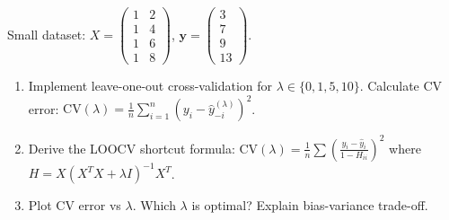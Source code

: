 \documentclass[12pt]{article}
\begin{document}
\begin{tcolorbox}[colback=blue!5!white, colframe=blue!75!black, title=Problem 22]
Small dataset: $X = \begin{pmatrix} 1 & 2 \\ 1 & 4 \\ 1 & 6 \\ 1 & 8 \end{pmatrix}$, $\mathbf{y} = \begin{pmatrix} 3 \\ 7 \\ 9 \\ 13 \end{pmatrix}$.

\begin{enumerate}
\item[(a)] Implement leave-one-out cross-validation for $\lambda \in \{0, 1, 5, 10\}$. Calculate CV error: $\text{CV}(\lambda) = \frac{1}{n}\sum_{i=1}^n (y_i - \hat{y}_{-i}^{(\lambda)})^2$.
\item[(b)] Derive the LOOCV shortcut formula: $\text{CV}(\lambda) = \frac{1}{n}\sum \left(\frac{y_i - \hat{y}_i}{1 - H_{ii}}\right)^2$ where $H = X(X^TX + \lambda I)^{-1}X^T$.
\item[(c)] Plot CV error vs $\lambda$. Which $\lambda$ is optimal? Explain bias-variance trade-off.
\end{enumerate}
\end{tcolorbox}
\end{document}

